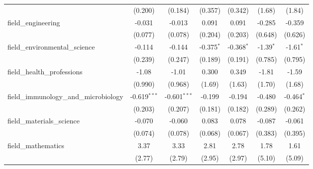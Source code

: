 \begin{tabular}{lcccccc}
                                                               & (0.200)        & (0.184)        & (0.357)        & (0.342)         & (1.68)       & (1.84)\\   
   field\_engineering                                          & -0.031         & -0.013         & 0.091          & 0.091           & -0.285       & -0.359\\   
                                                               & (0.077)        & (0.078)        & (0.204)        & (0.203)         & (0.648)      & (0.626)\\   
   field\_environmental\_science                               & -0.114         & -0.144         & -0.375$^{*}$   & -0.368$^{*}$    & -1.39$^{*}$  & -1.61$^{*}$\\   
                                                               & (0.239)        & (0.247)        & (0.189)        & (0.191)         & (0.785)      & (0.795)\\   
   field\_health\_professions                                  & -1.08          & -1.01          & 0.300          & 0.349           & -1.81        & -1.59\\   
                                                               & (0.990)        & (0.968)        & (1.69)         & (1.63)          & (1.70)       & (1.68)\\   
   field\_immunology\_and\_microbiology                        & -0.619$^{***}$ & -0.601$^{***}$ & -0.199         & -0.194          & -0.480       & -0.464$^{*}$\\   
                                                               & (0.203)        & (0.207)        & (0.181)        & (0.182)         & (0.289)      & (0.262)\\   
   field\_materials\_science                                   & -0.070         & -0.060         & 0.083          & 0.078           & -0.087       & -0.061\\   
                                                               & (0.074)        & (0.078)        & (0.068)        & (0.067)         & (0.383)      & (0.395)\\   
   field\_mathematics                                          & 3.37           & 3.33           & 2.81           & 2.78            & 1.78         & 1.61\\   
                                                               & (2.77)         & (2.79)         & (2.95)         & (2.97)          & (5.10)       & (5.09)\\   

\end{tabular}
